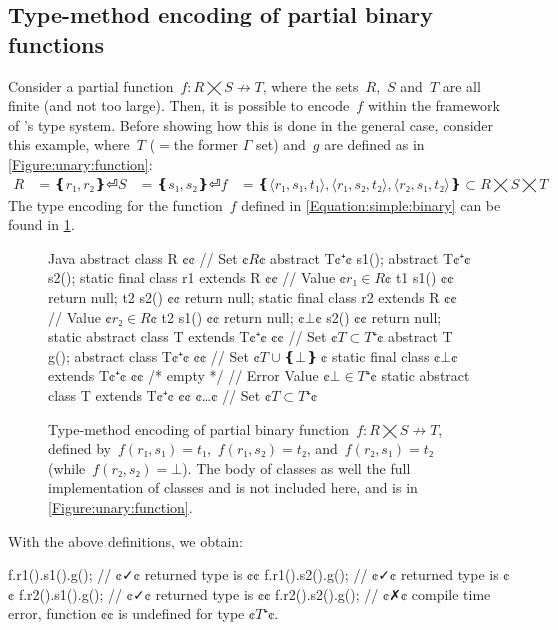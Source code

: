 \subsection{Type-method encoding of partial binary functions}
Consider a partial function~$f: R⨉S↛T$,
  where the sets~$R$,~$S$ and~$T$ are all finite (and not too large).
Then, it is possible to encode~$f$ within the framework of \Java's type system.
Before showing how this is done in the general case, consider this example,
where~$T$ ($=$the former $\Gamma$ set) and~$g$ are defined as in \cref{Figure:unary:function}:
\begin{equation}
  \label{Equation:simple:binary}
\begin{split}
  R & = ❴ r₁, r₂❵⏎
  S & = ❴ s₁, s₂❵⏎
  f & = ❴ ⟨r₁, s₁, t₁⟩, ⟨r₁, s₂, t₂⟩, ⟨r₂, s₁, t₂⟩ ❵ ⊂R⨉S⨉T
\end{split}
\end{equation}
The \Java type encoding for the function~$f$ defined in \cref{Equation:simple:binary}
  can be found in \cref{Figure:simple:binary}.

\begin{figure}[hbt]
  \begin{Code}{Java}
abstract class R {¢¢ // Set ¢$R$¢
  abstract T¢$⁺$¢ s1();
  abstract T¢$⁺$¢ s2();
  static final class r1 extends R {¢¢ // Value ¢$r₁∈R$¢
    t1 s1() {¢¢ return null; }
    t2 s2() {¢¢ return null; }
  }
  static final class r2 extends R {¢¢ // Value ¢$r₂∈R$¢
    t2 s1() {¢¢ return null; }
    ¢$⊥$¢ s2() {¢¢ return null; }
  }
  static abstract class T extends T¢$⁺$¢ {¢¢ // Set ¢$T⊂T⁺$¢
    abstract T g();
  }
  abstract class T¢$⁺$¢ {¢¢ // Set ¢$T∪❴⊥❵~$¢
    static final class ¢$⊥$¢ extends T¢$⁺$¢ {¢¢ /* empty */ } // Error Value ¢$⊥∈T⁺$¢
    static abstract class T extends T¢$⁺$¢ {¢¢ ¢…¢ } // Set ¢$T⊂T⁺$¢
  }
}
\end{Code}
  \caption{Type-method encoding of partial binary function~$f: R⨉S↛T$,
  defined by~$f(r₁,s₁)=t₁$,~$f(r₁,s₂)=t₂$, and~$f(r₂,s₁)=t₂$ (while~$f(r₂, s₂) =⊥$).
  The body of classes  as well the full implementation of classes  and  is not included here, and is
    in \cref{Figure:unary:function}.}
  \label{Figure:simple:binary}
\end{figure}

With the above definitions, we obtain:
\begin{JAVA}
f.r1().s1().g(); // ¢✓¢ returned type is ¢¢
f.r1().s2().g(); // ¢✓¢ returned type is ¢¢
f.r2().s1().g(); // ¢✓¢ returned type is ¢¢
f.r2().s2().g(); // ¢✗¢ compile time error, function ¢¢ is undefined for type ¢$T⁺$¢.
\end{JAVA}

